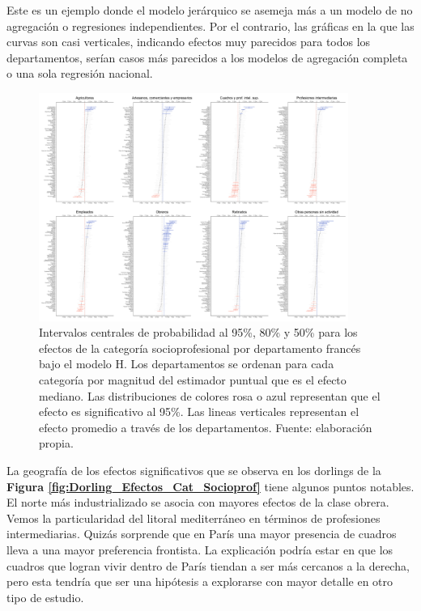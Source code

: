 Este es un ejemplo donde el modelo jerárquico se asemeja más a un modelo de no agregación o regresiones independientes. Por el contrario, las gráficas en la que las curvas son casi verticales, indicando efectos muy parecidos para todos los departamentos, serían casos más parecidos a los modelos de agregación completa o una sola regresión nacional.\\ 

\begin{figure}
	\centering
	\includegraphics[width = 0.9\textwidth]{Figs/Efectos/Efectos_Cat_Socioprof_Modelo_H}
	\caption{Intervalos centrales de probabilidad al 95\%, 80\% y 50\% para los efectos de la categoría socioprofesional por departamento francés bajo el modelo H. Los departamentos se ordenan para cada categoría por magnitud del estimador puntual que es el efecto mediano. Las distribuciones de colores rosa o azul representan que el efecto es significativo al 95\%. Las lineas verticales representan el efecto promedio a través de los departamentos. Fuente: elaboración propia.}
	\label{fig:Efectos_Cat_Socioprof}
\end{figure}

La geografía de los efectos significativos que se observa en los dorlings de la \textbf{Figura \ref{fig:Dorling_Efectos_Cat_Socioprof}} tiene algunos puntos notables. El norte más industrializado se asocia con mayores efectos de la clase obrera. Vemos la particularidad del litoral mediterráneo en términos de profesiones intermediarias. Quizás sorprende que en París una mayor presencia de cuadros lleva a una mayor preferencia frontista. La explicación podría estar en que los cuadros que logran vivir dentro de París tiendan a ser más cercanos a la derecha, pero esta tendría que ser una hipótesis a explorarse con mayor detalle en otro tipo de estudio. 

